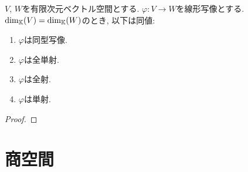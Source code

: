 \begin{prop}
  $V$, $W$を有限次元ベクトル空間とする.
  $\varphi\colon V\to W$を線形写像とする.
  $\dim_{\mathbb{K}}(V)=\dim_{\mathbb{K}}(W)$のとき, 以下は同値:
  \begin{enumerate}
  \item $\varphi$は同型写像.
  \item $\varphi$は全単射.
  \item $\varphi$は全射.
  \item $\varphi$は単射.
  \end{enumerate}
\end{prop}
\begin{proof}\end{proof}





\begin{quiz}
\end{quiz}

\chapter{商空間}
